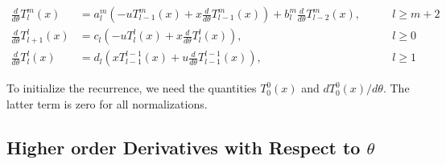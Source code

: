 \documentclass[12pt]{article}
\begin{document}
\begin{subequations}
\begin{alignat}{3}
\frac{d}{d \theta} T_l^m(x) &= a_l^m \left( -u T_{l-1}^m(x) + x \frac{d}{d \theta} T_{l-1}^m(x) \right) + b_l^m \frac{d}{d \theta} T_{l-2}^m(x), & \qquad l \geq m + 2 \\
\frac{d}{d \theta} T_{l+1}^l(x) &= c_l \left( -u T_l^l(x) + x \frac{d}{d \theta} T_l^l(x) \right), & \qquad l \geq 0 \\
\frac{d}{d \theta} T_l^l(x) &= d_l \left( x T_{l-1}^{l-1}(x) + u \frac{d}{d \theta} T_{l-1}^{l-1}(x) \right), & \qquad l \geq 1
\end{alignat}
\end{subequations}

To initialize the recurrence, we need the quantities $T_0^0(x)$ and $d T_0^0(x) / d\theta$. The latter
term is zero for all normalizations.

\subsection{Higher order Derivatives with Respect to $\theta$}
\end{document}
